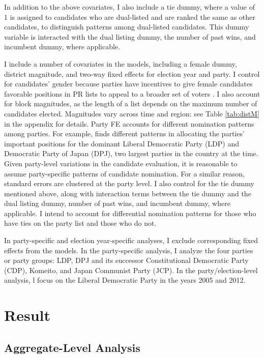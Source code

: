 \documentclass[a4paper, 11pt]{article}
\begin{document}
In addition to the above covariates, I also include a tie dummy, where a value of 1 is assigned to candidates who are dual-listed and are ranked the same as other candidates, to distinguish patterns among dual-listed candidates. This dummy variable is interacted with the dual listing dummy, the number of past wins, and incumbent dummy, where applicable. 

I include a number of covariates in the models, including a female dummy, district magnitude, and two-way fixed effects for election year and party. I control for candidates' gender because parties have incentives to give female candidates favorable positions in PR lists to appeal to a broader set of voters \citep{salmondProportionalRepresentationFemale2006, chiruValueLegislativeElectoral2017}. I also account for block magnitudes, as the length of a list depends on the maximum number of candidates elected. Magnitudes vary across time and region: see Table \ref{tab:distM} in the appendix for details. Party FE accounts for different nomination patterns among parties. For example, \citet{fujimuraShousenkyokuHireidaihyouHeiritsusei2012} finds different patterns in allocating the parties' important positions for the dominant Liberal Democratic Party (LDP) and Democratic Party of Japan (DPJ), two largest parties in the country at the time. Given party-level variations in the candidate evaluation, it is reasonable to assume party-specific patterns of candidate nomination. For a similar reason, standard errors are clustered at the party level. I also control for the tie dummy mentioned above, along with interaction terms between the tie dummy and the dual listing dummy, number of past wins, and incumbent dummy, where applicable. I intend to account for differential nomination patterns for those who have ties on the party list and those who do not. 

In party-specific and election year-specific analyses, I exclude corresponding fixed effects from the models. In the party-specific analysis, I analyze the four parties or party groups: LDP, DPJ and its successor Constitutional Democratic Party (CDP), Komeito, and Japan Communist Party (JCP). In the party/election-level analysis, l focus on the Liberal Democratic Party in the years 2005 and 2012.

\section{Result} \label{sec: res}

\subsection{Aggregate-Level Analysis}
\end{document}
